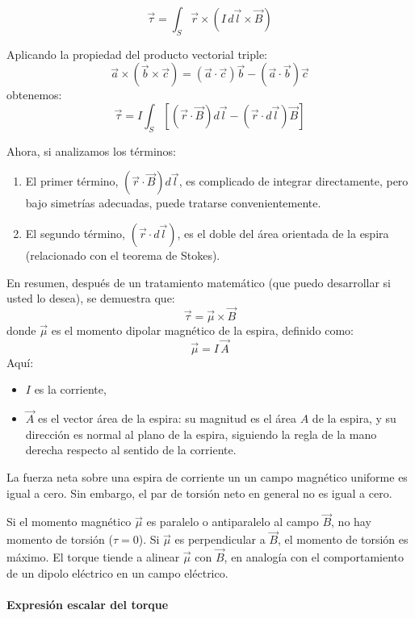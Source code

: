 \[
\vec{\tau} = \int_S \vec{r} \times (I \, d\vec{l} \times \vec{B})
\]

Aplicando la propiedad del producto vectorial triple:
\[
\vec{a} \times (\vec{b} \times \vec{c}) = (\vec{a} \cdot \vec{c})\vec{b} - (\vec{a} \cdot \vec{b})\vec{c}
\]
obtenemos:
\[
\vec{\tau} = I \int_S \left[ (\vec{r} \cdot \vec{B}) d\vec{l} - (\vec{r} \cdot d\vec{l}) \vec{B} \right]
\]

Ahora, si analizamos los términos:
\begin{enumerate}
  \item El primer término, \( (\vec{r} \cdot \vec{B}) d\vec{l} \), es complicado de integrar directamente, pero bajo simetrías adecuadas, puede tratarse convenientemente.
  \item El segundo término, \((\vec{r} \cdot d\vec{l})\), es el doble del área orientada de la espira (relacionado con el teorema de Stokes).
\end{enumerate}

En resumen, después de un tratamiento matemático (que puedo desarrollar si usted lo desea), se demuestra que:
\[
\vec{\tau} = \vec{\mu} \times \vec{B}
\]
donde \(\vec{\mu}\) es el momento dipolar magnético de la espira, definido como:
\[
\vec{\mu} = I \, \vec{A}
\]
Aquí:
\begin{itemize}
  \item \(I\) es la corriente,
  \item \(\vec{A}\) es el vector área de la espira: su magnitud es el área \(A\) de la espira, y su dirección es normal al plano de la espira, siguiendo la regla de la mano derecha respecto al sentido de la corriente.
\end{itemize}

\begin{tcolorbox}[myconclusion]
  La fuerza neta sobre una espira de corriente un un campo magnético uniforme es igual a cero. Sin embargo, el par de torsión neto en general no es igual a cero.
\end{tcolorbox}

Si el momento magnético \(\vec{\mu}\) es paralelo o antiparalelo al campo \(\vec{B}\), no hay momento de torsión (\(\tau = 0\)). Si \(\vec{\mu}\) es perpendicular a \(\vec{B}\), el momento de torsión es máximo. El torque tiende a alinear \(\vec{\mu}\) con \(\vec{B}\), en analogía con el comportamiento de un dipolo eléctrico en un campo eléctrico.

\paragraph{Expresión escalar del torque}

